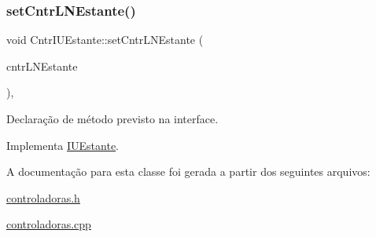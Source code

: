 \subsubsection{\texorpdfstring{set\+Cntr\+L\+N\+Estante()}{setCntrLNEstante()}}
{\footnotesize\ttfamily void Cntr\+I\+U\+Estante\+::set\+Cntr\+L\+N\+Estante (\begin{DoxyParamCaption}\item[{\hyperlink{class_i_l_n_estante}{I\+L\+N\+Estante} $\ast$}]{cntr\+L\+N\+Estante }\end{DoxyParamCaption})\hspace{0.3cm}{\ttfamily [inline]}, {\ttfamily [virtual]}}

Declaração de método previsto na interface. 

Implementa \hyperlink{class_i_u_estante_ae119ca49fad9d22502177f7bfd6933a2}{I\+U\+Estante}.



A documentação para esta classe foi gerada a partir dos seguintes arquivos\+:\begin{DoxyCompactItemize}
\item 
\hyperlink{controladoras_8h}{controladoras.\+h}\item 
\hyperlink{controladoras_8cpp}{controladoras.\+cpp}\end{DoxyCompactItemize}
